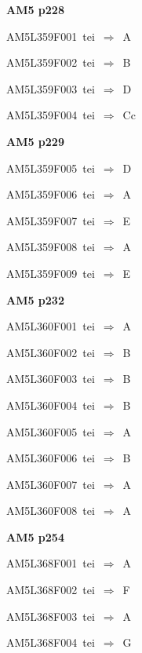 \par\vfill\eject
{\bf\hfill AM5 p228\hfill\hbox{}}\par\bigskip
{\sixrm AM5L359F001\ {\sixit tei}\ }$\Rightarrow$\ A\par\smallskip
{\sixrm AM5L359F002\ {\sixit tei}\ }$\Rightarrow$\ B\par\smallskip
{\sixrm AM5L359F003\ {\sixit tei}\ }$\Rightarrow$\ D\par\smallskip
{\sixrm AM5L359F004\ {\sixit tei}\ }$\Rightarrow$\ Cc\par\smallskip

\par\vfill\eject
{\bf\hfill AM5 p229\hfill\hbox{}}\par\bigskip
{\sixrm AM5L359F005\ {\sixit tei}\ }$\Rightarrow$\ D\par\smallskip
{\sixrm AM5L359F006\ {\sixit tei}\ }$\Rightarrow$\ A\par\smallskip
{\sixrm AM5L359F007\ {\sixit tei}\ }$\Rightarrow$\ E\par\smallskip
{\sixrm AM5L359F008\ {\sixit tei}\ }$\Rightarrow$\ A\par\smallskip
{\sixrm AM5L359F009\ {\sixit tei}\ }$\Rightarrow$\ E\par\smallskip

\par\vfill\eject
{\bf\hfill AM5 p232\hfill\hbox{}}\par\bigskip
{\sixrm AM5L360F001\ {\sixit tei}\ }$\Rightarrow$\ A\par\smallskip
{\sixrm AM5L360F002\ {\sixit tei}\ }$\Rightarrow$\ B\par\smallskip
{\sixrm AM5L360F003\ {\sixit tei}\ }$\Rightarrow$\ B\par\smallskip
{\sixrm AM5L360F004\ {\sixit tei}\ }$\Rightarrow$\ B\par\smallskip
{\sixrm AM5L360F005\ {\sixit tei}\ }$\Rightarrow$\ A\par\smallskip
{\sixrm AM5L360F006\ {\sixit tei}\ }$\Rightarrow$\ B\par\smallskip
{\sixrm AM5L360F007\ {\sixit tei}\ }$\Rightarrow$\ A\par\smallskip
{\sixrm AM5L360F008\ {\sixit tei}\ }$\Rightarrow$\ A\par\smallskip

\par\vfill\eject
{\bf\hfill AM5 p254\hfill\hbox{}}\par\bigskip
{\sixrm AM5L368F001\ {\sixit tei}\ }$\Rightarrow$\ A\par\smallskip
{\sixrm AM5L368F002\ {\sixit tei}\ }$\Rightarrow$\ F\par\smallskip
{\sixrm AM5L368F003\ {\sixit tei}\ }$\Rightarrow$\ A\par\smallskip
{\sixrm AM5L368F004\ {\sixit tei}\ }$\Rightarrow$\ G\par\smallskip

